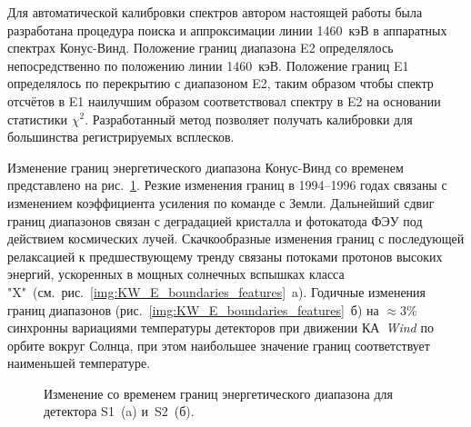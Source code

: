 Для автоматической калибровки спектров автором настоящей работы была 
разработана процедура поиска и аппроксимации линии 1460~кэВ в аппаратных спектрах 
Конус-Винд. Положение границ диапазона E2 определялось непосредственно по положению 
линии 1460~кэВ. Положение границ E1 определялось по перекрытию с диапазоном E2, 
таким образом чтобы спектр отсчётов в E1 наилучшим образом соответствовал спектру в E2 
на основании статистики $\chi^2$. Разработанный метод позволяет получать калибровки 
для большинства регистрируемых всплесков.

Изменение границ энергетического диапазона Конус-Винд со временем представлено 
на рис.~\ref{img:KW_E_boundaries}. Резкие изменения границ в 1994--1996 годах 
связаны с изменением коэффициента усиления по команде с Земли. Дальнейший сдвиг 
границ диапазонов связан с деградацией кристалла и фотокатода ФЭУ под действием 
космических лучей. Скачкообразные изменения границ с последующей релаксацией 
к предшествующему тренду связаны потоками протонов высоких энергий, ускоренных в мощных 
солнечных вспышках класса "X"\ (см.~рис.~\ref{img:KW_E_boundaries_features}~a). 
Годичные изменения границ диапазонов (рис.~\ref{img:KW_E_boundaries_features}~б) 
на $\approx 3$\% синхронны вариациями температуры детекторов при движении 
КА~\textit{Wind} по орбите вокруг Солнца, при этом наибольшее значение границ 
соответствует наименьшей температуре.

\begin{figure}[h]
  \begin{minipage}[h]{0.5\textwidth}
  \end{minipage}
  \hfill
  \begin{minipage}[h]{0.5\textwidth}
  \end{minipage}
  \caption[Изменение со временем границ энергетического диапазона для детектора S1 и~S2.]
  {Изменение со временем границ энергетического диапазона для детектора S1~(a) и~S2~(б).}
  \label{img:KW_E_boundaries}  
\end{figure}

